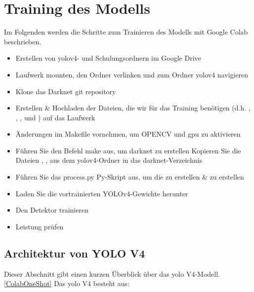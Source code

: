 \section{Training des Modells}

Im Folgenden werden die Schritte zum Trainieren des Modells mit Google Colab beschrieben.

\begin{itemize}
  \item Erstellen von yolov4- und Schulungsordnern im Google Drive
  \item Laufwerk mounten, den Ordner verlinken und zum Ordner yolov4 navigieren
  \item Klone das Darknet git repository \cite{Bochkovskiy:2020}
  \item Erstellen \& Hochladen der Dateien, die wir für das Training benötigen (d.h.  , , ,  und  ) auf das Laufwerk
  \item Änderungen im Makefile vornehmen, um OPENCV und \ac{gpu} zu aktivieren
  \item Führen Sie den Befehl make aus, um darknet zu erstellen
        Kopieren Sie die Dateien ,   ,  aus dem yolov4-Ordner in das darknet-Verzeichnis
  \item Führen Sie das process.py Py-Skript aus, um die  zu erstellen \&  zu erstellen
  \item Laden Sie die vortrainierten YOLOv4-Gewichte herunter
  \item Den Detektor trainieren
  \item Leistung prüfen
\end{itemize}

\subsection{Architektur von YOLO V4} 

Dieser Abschnitt gibt einen kurzen Überblick über das \ac{yolo} V4-Modell.\ref{ColabOneShot}
Das \ac{yolo} V4 \cite{Bochkovskiy:2020} besteht aus:


